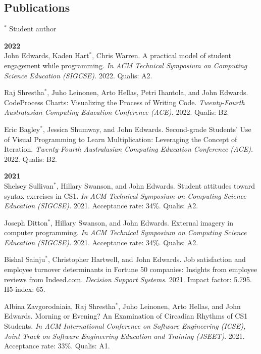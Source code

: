 \documentclass[margin,line]{res}
\begin{document}
\begin{resume}
\section{\sc Publications}

\begin{footnotesize}$^*$ Student author\end{footnotesize}

\textbf{2022} \\
John Edwards, Kaden Hart$^*$, Chris Warren. A practical model of student engagement while programming. \textit{In ACM Technical Symposium on Computing Science Education (SIGCSE).} 2022. Qualis: A2.

Raj Shrestha$^*$, Juho Leinonen, Arto Hellas, Petri Ihantola, and John Edwards. CodeProcess Charts: Visualizing the Process of Writing Code. \textit{Twenty-Fourth Australasian Computing Education Conference (ACE).} 2022. Qualis: B2.

Eric Bagley$^*$, Jessica Shumway, and John Edwards. Second-grade Students' Use of Visual Programming to Learn Multiplication: Leveraging the Concept of Iteration. \textit{Twenty-Fourth Australasian Computing Education Conference (ACE).} 2022. Qualis: B2.

\textbf{2021} \\
Shelsey Sullivan$^*$, Hillary Swanson, and John Edwards. Student attitudes toward syntax exercises in CS1. \textit{In ACM Technical Symposium on Computing Science Education (SIGCSE).} 2021. Acceptance rate: 34\%. Qualis: A2.

Joseph Ditton$^*$, Hillary Swanson, and John Edwards. External imagery in computer programming. \textit{In ACM Technical Symposium on Computing Science Education (SIGCSE).} 2021. Acceptance rate: 34\%. Qualis: A2.

Bishal Sainju$^*$, Christopher Hartwell, and John Edwards. Job satisfaction and employee turnover determinants in Fortune 50 companies: Insights from employee reviews from Indeed.com. \textit{Decision Support Systems}. 2021. Impact factor: 5.795. H5-index: 65.

Albina Zavgorodniaia, Raj Shrestha$^*$, Juho Leinonen, Arto Hellas, and John Edwards. Morning or Evening? An Examination of Circadian Rhythms of CS1 Students. \textit{In ACM International Conference on Software Engineering (ICSE), Joint Track on Software Engineering Education and Training (JSEET)}. 2021. Acceptance rate: 33\%. Qualis: A1.


\end{resume}
\end{document}

